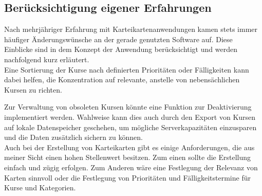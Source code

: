 





\subsection{Berücksichtigung eigener Erfahrungen}
Nach mehrjähriger Erfahrung mit Karteikartenanwendungen kamen stets immer häufiger Änderungswünsche an der gerade genutzten Software auf. Diese Einblicke sind in dem Konzept der Anwendung berücksichtigt und werden nachfolgend kurz erläutert. \\

\noindent Eine Sortierung der Kurse nach definierten Prioritäten oder Fälligkeiten kann dabei helfen, die Konzentration auf relevante, anstelle von nebensächlichen Kursen zu richten.

\noindent Zur Verwaltung von obsoleten Kursen könnte eine Funktion zur Deaktivierung implementiert werden. Wahlweise kann dies auch durch den Export von Kursen auf lokale Datenspeicher geschehen, um mögliche Serverkapazitäten einzusparen und die Daten zusätzlich sichern zu können. \\

\noindent Auch bei der Erstellung von Karteikarten gibt es einige Anforderungen, die aus meiner Sicht einen hohen Stellenwert besitzen. Zum einen sollte die Erstellung einfach und zügig erfolgen. Zum Anderen wäre eine Festlegung der Relevanz von Karten sinnvoll oder die Festlegung von Prioritäten und Fälligkeitstermine für Kurse und Kategorien. \\

